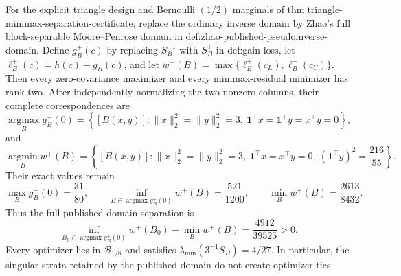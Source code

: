 For the explicit triangle design and Bernoulli \((1/2)\) marginals of thm:triangle-minimax-separation-certificate, replace the ordinary inverse domain by Zhao's full block-separable Moore--Penrose domain in def:zhao-published-pseudoinverse-domain.  Define \(g_B^{+}(c)\) by replacing \(S_B^{-1}\) with \(S_B^{+}\) in def:gain-loss, let \(\ell_B^{+}(c)=h(c)-g_B^{+}(c)\), and let \(w^{+}(B)=\max\{\ell_B^{+}(c_L),\ell_B^{+}(c_U)\}\).  Then every zero-covariance maximizer and every minimax-residual minimizer has rank two.  After independently normalizing the two nonzero columns, their complete correspondences are
\[
\operatorname*{argmax}_{B}g_B^{+}(0)=
\left\{[B(x,y)]:
\lVert x\rVert_2^2=\lVert y\rVert_2^2=3,
\ \mathbf1^{\top}x=\mathbf1^{\top}y=x^{\top}y=0
\right\},
\]
and
\[
\operatorname*{argmin}_{B}w^{+}(B)=
\left\{[B(x,y)]:
\lVert x\rVert_2^2=\lVert y\rVert_2^2=3,
\ \mathbf1^{\top}x=x^{\top}y=0,
\ (\mathbf1^{\top}y)^2=\frac{216}{55}
\right\}.
\]
Their exact values remain
\[
\max_B g_B^{+}(0)=\frac{31}{80},
\qquad
\inf_{B\in\operatorname*{argmax}g_B^{+}(0)}w^{+}(B)=\frac{521}{1200},
\qquad
\min_B w^{+}(B)=\frac{2613}{8432}.
\]
Thus the full published-domain separation is
\[
\inf_{B_0\in\operatorname*{argmax}g_B^{+}(0)}w^{+}(B_0)
-\min_Bw^{+}(B)
=\frac{4912}{39525}>0.
\]
Every optimizer lies in \(\mathcal B_{1/8}\) and satisfies \(\lambda_{\min}(3^{-1}S_B)=4/27\).  In particular, the singular strata retained by the published domain do not create optimizer ties.